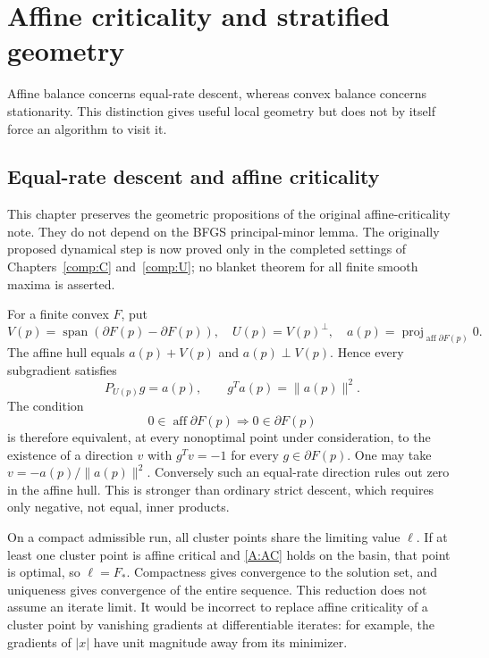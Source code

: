 \chapter{Affine criticality and stratified geometry}\label{comp:A}\label{A:chapter}
\renewcommand{\ModuleTag}{8}
Affine balance concerns equal-rate descent, whereas convex balance concerns stationarity. This distinction gives useful local geometry but does not by itself force an algorithm to visit it.


\section{Equal-rate descent and affine criticality}

This chapter preserves the geometric propositions of the original affine-criticality note. They do not depend on the BFGS principal-minor lemma. The originally proposed dynamical step is now proved only in the completed settings of Chapters~\ref{comp:C} and~\ref{comp:U}; no blanket theorem for all finite smooth maxima is asserted.

For a finite convex $F$, put
\[
 V(p)=\operatorname{span}(\partial F(p)-\partial F(p)),\quad U(p)=V(p)^\perp,
 \quad a(p)=\operatorname{proj}_{\operatorname{aff}\partial F(p)}0.
\]
The affine hull equals $a(p)+V(p)$ and $a(p)\perp V(p)$. Hence every subgradient satisfies
\[
 P_{U(p)}g=a(p),\qquad g^Ta(p)=\|a(p)\|^2.
\]
The condition
\begin{equation}\label{A:AC}
 0\in\operatorname{aff}\partial F(p)\Longrightarrow0\in\partial F(p)
\end{equation}
is therefore equivalent, at every nonoptimal point under consideration, to the existence of a direction $v$ with $g^Tv=-1$ for every $g\in\partial F(p)$. One may take $v=-a(p)/\|a(p)\|^2$. Conversely such an equal-rate direction rules out zero in the affine hull. This is stronger than ordinary strict descent, which requires only negative, not equal, inner products.

On a compact admissible run, all cluster points share the limiting value $\ell$. If at least one cluster point is affine critical and \eqref{A:AC} holds on the basin, that point is optimal, so $\ell=F_*$. Compactness gives convergence to the solution set, and uniqueness gives convergence of the entire sequence. This reduction does not assume an iterate limit. It would be incorrect to replace affine criticality of a cluster point by vanishing gradients at differentiable iterates: for example, the gradients of $|x|$ have unit magnitude away from its minimizer.

